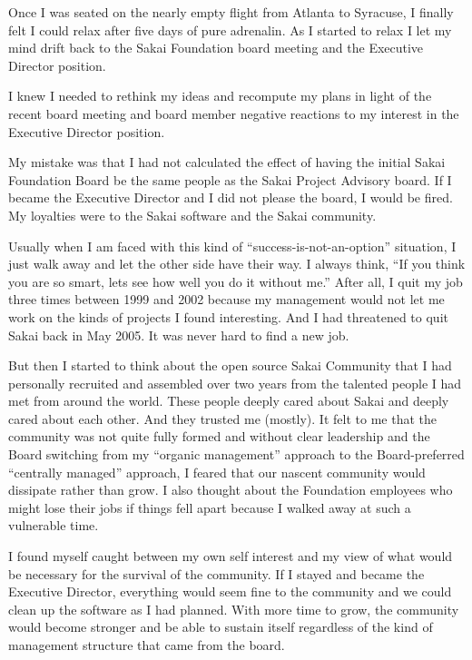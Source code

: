 \documentclass[12pt]{book}
\begin{document}
Once I was seated on the nearly empty flight from
Atlanta to Syracuse, I finally felt I could relax after
five days of pure adrenalin.  As I started to relax I
let my mind drift back to the Sakai Foundation board meeting
and the Executive Director position.

I knew I needed to rethink my ideas and recompute my plans
in light of the recent board meeting and board member
negative reactions to my interest in the Executive
Director position.

My mistake was that I had not calculated the effect
of having the initial
Sakai Foundation Board be the same people as the
Sakai Project Advisory board.  If I became the
Executive Director and I did not please the board, I would
be fired.  My loyalties were to the Sakai software
and the Sakai community.

Usually when I am faced with this kind of
``success-is-not-an-option'' situation, I just walk
away and let the other side have their way.  I always
think, ``If you
think you are so smart, lets see how well you do it
without me.''  After all, I quit my job three times
between 1999 and 2002 because my management would not
let me work on the kinds of projects I found
interesting.  And I had threatened to quit Sakai back
in May 2005.  It was never hard to find a new job.

But then I started to think about the open source Sakai
Community that I had personally recruited and assembled
over two years from the talented people I had met
from around the world.  These people deeply cared about
Sakai and deeply cared about each other.  And they trusted
me (mostly).  It felt to me that the community was not quite fully
formed and without clear leadership and the Board
switching from my ``organic management'' approach to the
Board-preferred ``centrally managed'' approach, I feared
that our nascent community would dissipate rather than
grow. I also thought about the Foundation employees who
might lose their jobs if things fell apart because I
walked away at such a vulnerable time.

I found myself caught between my own self interest
and my view of what would be necessary for the survival
of the community.  If I stayed and became the Executive
Director, everything would seem fine to the community
and we could clean up the software as I had planned.
With more time to grow, the community would become
stronger and be able to sustain itself regardless of
the kind of management structure that came from the board.
\end{document}
